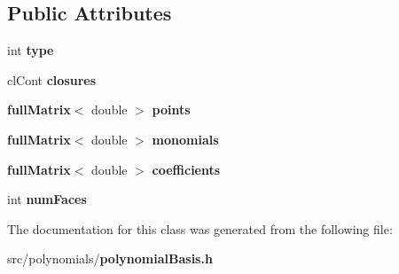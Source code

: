 \subsection*{Public Attributes}
\begin{DoxyCompactItemize}
\item 
int {\bfseries type}\label{classpolynomialBasis_a9c19d655bf6ff6681cfd7b9575344676}

\item 
cl\-Cont {\bfseries closures}\label{classpolynomialBasis_a634b377a0bbfbc7249238e6c48edebf2}

\item 
{\bf full\-Matrix}$<$ double $>$ {\bfseries points}\label{classpolynomialBasis_a1a260e8c1017140bccca105223862a64}

\item 
{\bf full\-Matrix}$<$ double $>$ {\bfseries monomials}\label{classpolynomialBasis_ae42878048da51c5cc6f830ebff260836}

\item 
{\bf full\-Matrix}$<$ double $>$ {\bfseries coefficients}\label{classpolynomialBasis_ab2edf9935062910cf6c7eb08a5a3a691}

\item 
int {\bfseries num\-Faces}\label{classpolynomialBasis_a6f59f514eac7b127ed3845cebd8a56ef}

\end{DoxyCompactItemize}


The documentation for this class was generated from the following file\-:\begin{DoxyCompactItemize}
\item 
src/polynomials/{\bf polynomial\-Basis.\-h}\end{DoxyCompactItemize}
